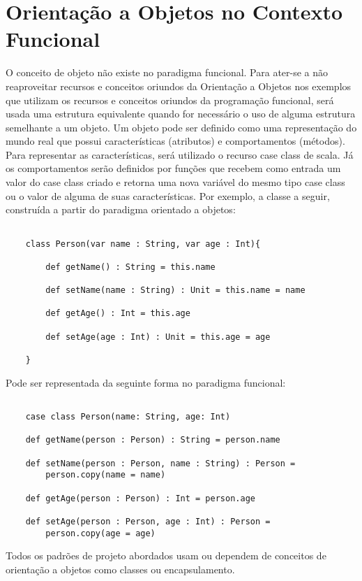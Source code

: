 
\chapter{Orientação a Objetos no Contexto Funcional}

O conceito de objeto não existe no paradigma funcional. 
Para ater-se a não reaproveitar recursos e conceitos 
oriundos da Orientação a Objetos nos exemplos que 
utilizam os recursos e conceitos oriundos da 
programação funcional, será usada uma estrutura 
equivalente quando for necessário o uso de alguma 
estrutura semelhante a um objeto.
Um objeto pode ser definido como uma representação 
do mundo real que possui características (atributos) 
e comportamentos (métodos). Para representar as 
características, será utilizado o recurso case 
class de scala. Já os comportamentos serão definidos 
por funções que recebem como entrada um valor do 
case class criado e retorna uma nova variável do 
mesmo tipo case class ou o valor de alguma de suas 
características. Por exemplo, a classe a seguir, 
construída a partir do paradigma orientado a objetos:



\begin{lstlisting}[caption={Classe comum em Orientação a Objetos},label=ooclass]
    
    class Person(var name : String, var age : Int){

        def getName() : String = this.name

        def setName(name : String) : Unit = this.name = name

        def getAge() : Int = this.age

        def setAge(age : Int) : Unit = this.age = age

    }   

\end{lstlisting}



Pode ser representada da seguinte forma no paradigma funcional:

\begin{lstlisting}[caption={Representação de uma classe no contexto funcional},label=pfclass]
    
    case class Person(name: String, age: Int)

    def getName(person : Person) : String = person.name

    def setName(person : Person, name : String) : Person = 
        person.copy(name = name)

    def getAge(person : Person) : Int = person.age

    def setAge(person : Person, age : Int) : Person =
        person.copy(age = age)

\end{lstlisting}



Todos os padrões de projeto abordados usam ou 
dependem de conceitos de orientação a objetos 
como classes ou encapsulamento. 












